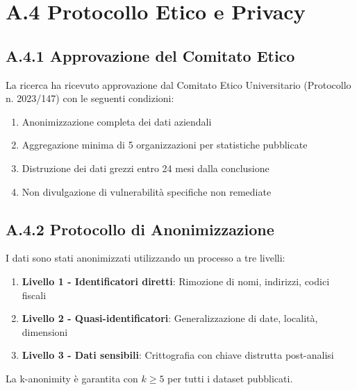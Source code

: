 \section{A.4 Protocollo Etico e Privacy}

\subsection{A.4.1 Approvazione del Comitato Etico}

La ricerca ha ricevuto approvazione dal Comitato Etico Universitario (Protocollo n. 2023/147) con le seguenti condizioni:

\begin{enumerate}
    \item Anonimizzazione completa dei dati aziendali
    \item Aggregazione minima di 5 organizzazioni per statistiche pubblicate
    \item Distruzione dei dati grezzi entro 24 mesi dalla conclusione
    \item Non divulgazione di vulnerabilità specifiche non remediate
\end{enumerate}

\subsection{A.4.2 Protocollo di Anonimizzazione}

I dati sono stati anonimizzati utilizzando un processo a tre livelli:

\begin{enumerate}
    \item \textbf{Livello 1 - Identificatori diretti}: Rimozione di nomi, indirizzi, codici fiscali
    \item \textbf{Livello 2 - Quasi-identificatori}: Generalizzazione di date, località, dimensioni
    \item \textbf{Livello 3 - Dati sensibili}: Crittografia con chiave distrutta post-analisi
\end{enumerate}

La k-anonimity è garantita con $k \geq 5$ per tutti i dataset pubblicati.




%
